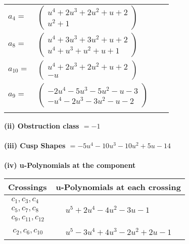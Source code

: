 \documentclass[1p]{elsarticle_modified}
\theoremstyle{definition}
\begin{document}
\begin{tabular}{m{7pt} m{180pt} m{7pt} m{180pt} }
\flushright $a_{4}=$&$\begin{pmatrix}u^4+2 u^3+2 u^2+u+2\\u^2+1\end{pmatrix}$ \\
\flushright $a_{8}=$&$\begin{pmatrix}u^4+3 u^3+3 u^2+u+2\\u^4+u^3+u^2+u+1\end{pmatrix}$ \\
\flushright $a_{10}=$&$\begin{pmatrix}u^4+2 u^3+2 u^2+u+2\\- u\end{pmatrix}$ \\
\flushright $a_{9}=$&$\begin{pmatrix}-2 u^4-5 u^3-5 u^2- u-3\\- u^4-2 u^3-3 u^2- u-2\end{pmatrix}$\\&\end{tabular}
\flushleft \textbf{(ii) Obstruction class $= -1$}\\~\\
\flushleft \textbf{(iii) Cusp Shapes $= -5 u^4-10 u^3-10 u^2+5 u-14$}\\~\\
\newpage\renewcommand{\arraystretch}{1}
\flushleft \textbf{(iv) u-Polynomials at the component}\newline \\
\begin{tabular}{m{50pt}|m{274pt}}
Crossings & \hspace{64pt}u-Polynomials at each crossing \\
\hline $$\begin{aligned}c_{1},c_{3},c_{4}\\c_{5},c_{7},c_{8}\\c_{9},c_{11},c_{12}\end{aligned}$$&$\begin{aligned}
&u^5+2 u^4-4 u^2-3 u-1
\end{aligned}$\\
\hline $$\begin{aligned}c_{2},c_{6},c_{10}\end{aligned}$$&$\begin{aligned}
&u^5-3 u^4+4 u^3-2 u^2+2 u-1
\end{aligned}$\\
\hline
\end{tabular}\\~\\
\end{document}
